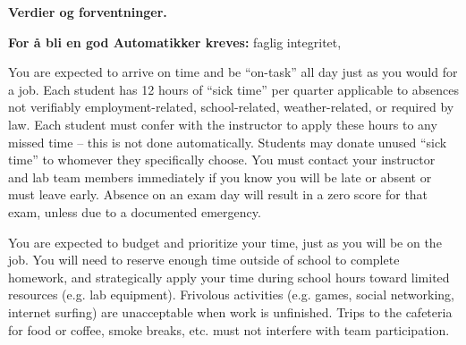

\centerline{\bf Verdier og forventninger. } \bigskip 

\noindent
{\bf For å bli en god Automatikker kreves:} faglig integritet,   


\vskip 10pt

\noindent

\vskip 10pt

\noindent
{} You are expected to arrive on time and be ``on-task'' all day just as you would for a job.  Each student has 12 hours of ``sick time'' per quarter applicable to absences not verifiably employment-related, school-related, weather-related, or required by law.  Each student must confer with the instructor to apply these hours to any missed time -- this is not done automatically.  Students may donate unused ``sick time'' to whomever they specifically choose.  You must contact your instructor and lab team members immediately if you know you will be late or absent or must leave early.  Absence on an exam day will result in a zero score for that exam, unless due to a documented emergency.

\vskip 10pt

\noindent
{} You are expected to budget and prioritize your time, just as you will be on the job.  You will need to reserve enough time outside of school to complete homework, and strategically apply your time during school hours toward limited resources (e.g. lab equipment).  Frivolous activities (e.g. games, social networking, internet surfing) are unacceptable when work is unfinished.  Trips to the cafeteria for food or coffee, smoke breaks, etc. must not interfere with team participation.

